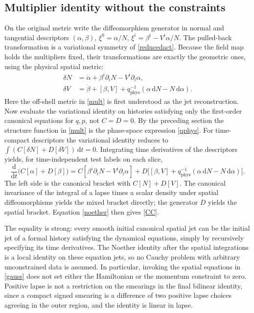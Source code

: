 \documentclass[11pt]{article}
\newcommand{\dd}{\mathrm d}
\begin{document}
\subsection{Multiplier identity without the constraints}
On the original metric write the diffeomorphism generator in normal and tangential descriptors \((\alpha,\beta)\),
\(\xi^0=\alpha/N\), \(\xi^i=\beta^i-V^i\alpha/N\).
The pulled-back transformation is a variational symmetry of \eqref{reducedact}. Because the field map holds the multipliers fixed, their transformations are exactly the geometric ones, using the physical spatial metric:
\begin{align}
 \delta N&=\dot\alpha+\beta^i\partial_iN-V^i\partial_i\alpha,\\
 \delta V&=\dot\beta+[\beta,V]+q_{\mathrm{phys}}^{-1}
                      (\alpha\,\dd N-N\,\dd\alpha). \label{mult}
\end{align}
Here the off-shell metric in \eqref{mult} is first understood as the jet reconstruction. Now evaluate the variational identity on histories satisfying only the first-order canonical equations for \(q,p\), not \(C=D=0\). By the preceding section the structure function in \eqref{mult} is the phase-space expression \eqref{qphys}. For time-compact descriptors the variational identity reduces to \(\int(C[\delta N]+D[\delta V])\,\dd t=0\). Integrating time derivatives of the descriptors yields, for time-independent test labels on each slice,
\begin{equation}
 \frac{\dd}{\dd t}\bigl(C[\alpha]+D[\beta]\bigr)=
 C[\beta^i\partial_iN-V^i\partial_i\alpha]+
 D\bigl[[\beta,V]+q_{\mathrm{phys}}^{-1}(\alpha\,\dd N-N\,\dd\alpha)\bigr].
 \label{noether}
\end{equation}
The left side is the canonical bracket with \(C[N]+D[V]\).
The canonical invariance of the integral of a lapse times a scalar density under spatial diffeomorphisms yields the mixed bracket directly; the generator \(D\) yields the spatial bracket. Equation \eqref{noether} then gives \eqref{CC}.

The equality is strong: every smooth initial canonical spatial jet can be the initial jet of a formal history satisfying the dynamical equations, simply by recursively specifying its time derivatives. The Noether identity after the spatial integrations is a local identity on these equation jets, so no Cauchy problem with arbitrary unconstrained data is assumed. In particular, invoking the spatial equations in \eqref{gauss} does not set either the Hamiltonian or the momentum constraint to zero. Positive lapse is not a restriction on the smearings in the final bilinear identity, since a compact signed smearing is a difference of two positive lapse choices agreeing in the outer region, and the identity is linear in lapse.
\end{document}

